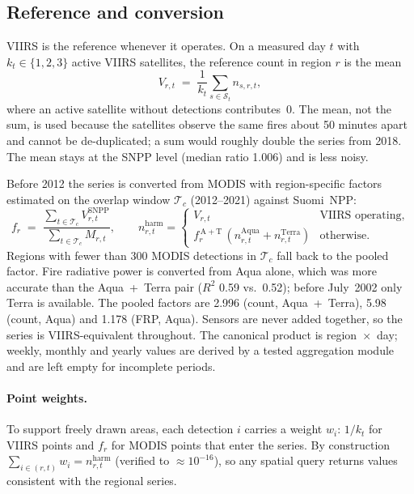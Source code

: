 \documentclass[11pt,a4paper]{article}
\begin{document}
\subsection{Reference and conversion}
VIIRS is the reference whenever it operates. On a measured day $t$ with $k_t\in\{1,2,3\}$ active VIIRS
satellites, the reference count in region $r$ is the mean
\begin{equation}
  V_{r,t} \;=\; \frac{1}{k_t}\sum_{s\in\mathcal{S}_t} n_{s,r,t},
\end{equation}
where an active satellite without detections contributes~0. The mean, not the sum, is used because the
satellites observe the same fires about 50 minutes apart and cannot be de-duplicated; a sum would roughly
double the series from 2018. The mean stays at the SNPP level (median ratio 1.006) and is less noisy.

Before 2012 the series is converted from MODIS with region-specific factors estimated on the overlap
window $\mathcal{T}_c$ (2012--2021) against Suomi~NPP:
\begin{equation}
  f_r \;=\; \frac{\sum_{t\in\mathcal{T}_c} V^{\mathrm{SNPP}}_{r,t}}{\sum_{t\in\mathcal{T}_c} M_{r,t}},
  \qquad
  n^{\mathrm{harm}}_{r,t} =
  \begin{cases}
    V_{r,t} & \text{VIIRS operating},\\
    f^{\,\mathrm{A+T}}_r\,(n^{\mathrm{Aqua}}_{r,t}+n^{\mathrm{Terra}}_{r,t}) & \text{otherwise}.
  \end{cases}
\end{equation}
Regions with fewer than 300 MODIS detections in $\mathcal{T}_c$ fall back to the pooled factor. Fire
radiative power is converted from Aqua alone, which was more accurate than the Aqua~+~Terra pair
($R^2$ 0.59 vs.\ 0.52); before July~2002 only Terra is available. The pooled factors are 2.996 (count,
Aqua~+~Terra), 5.98 (count, Aqua) and 1.178 (FRP, Aqua). Sensors are never added together, so the series
is VIIRS-equivalent throughout. The canonical product is region~$\times$~day; weekly, monthly and yearly
values are derived by a tested aggregation module and are left empty for incomplete periods.

\paragraph{Point weights.}
To support freely drawn areas, each detection $i$ carries a weight $w_i$: $1/k_t$ for VIIRS points and
$f_r$ for MODIS points that enter the series. By construction
$\sum_{i\in(r,t)} w_i = n^{\mathrm{harm}}_{r,t}$ (verified to $\approx 10^{-16}$), so any spatial query
returns values consistent with the regional series.
\end{document}
